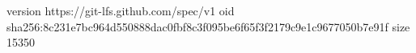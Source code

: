 version https://git-lfs.github.com/spec/v1
oid sha256:8c231e7bc964d550888dac0fbf8c3f095be6f65f3f2179c9e1c9677050b7e91f
size 15350
